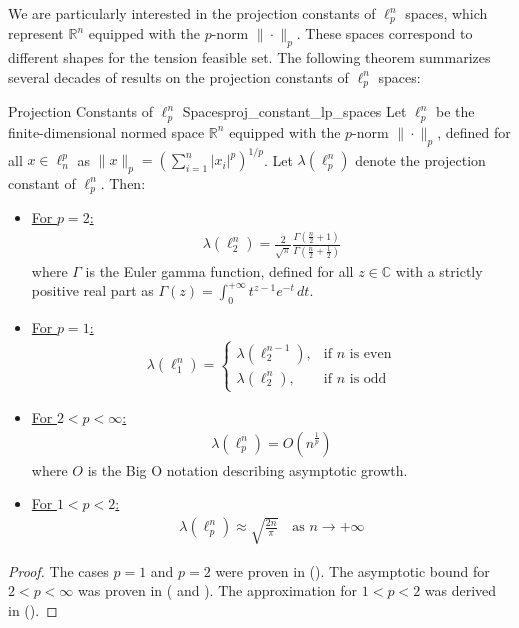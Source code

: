We are particularly interested in the projection constants of $\ell_p^n$ spaces, which represent $\mathbb{R}^n$ equipped with the $p$-norm $\|\cdot\|_p$. These spaces correspond to different shapes for the tension feasible set. The following theorem summarizes several decades of results on the projection constants of $\ell_p^n$ spaces:

\begin{theorembox}{Projection Constants of $\ell_p^n$ Spaces}{proj_constant_lp_spaces}
  Let $\ell_p^n$ be the finite-dimensional normed space $\mathbb{R}^n$ equipped with the $p$-norm $\|\cdot\|_p$, defined for all $x\in \ell_n^p$ as $\|x\|_p=\left(\sum_{i=1}^n \vert x_i \vert^p\right)^{1/p}$. Let $\lambda(\ell_p^n)$ denote the projection constant of $\ell_p^n$. Then:

  \vspace{5mm}

  \begin{itemize}
    \item \underline{For $p=2$:}
    \begin{align*}
            \lambda(\ell_2^n) = \frac{2}{\sqrt{\pi}}\frac{\Gamma(\frac{n}{2} + 1)}{\Gamma(\frac{n}{2} + \frac{1}{2})}
            \end{align*}
    where $\Gamma$ is the Euler gamma function, defined for all $z \in \mathbb{C}$ with a strictly positive real part as $\Gamma(z)=\int_0^{+\infty}t^{z-1}e^{-t}\,dt$.
    \item \vspace{5mm} \underline{For $p=1$:}
    \begin{align*}
            \lambda(\ell_1^n) = \begin{cases} 
               \lambda(\ell_2^{n-1}), & \text{if $n$ is even} \\
               \lambda(\ell_2^n), & \text{if $n$ is odd}
             \end{cases}
            \end{align*}
    \item \vspace{5mm} \underline{For $2<p<\infty$:}
    \begin{align*}
            \lambda(\ell_p^n) = O(n^{\frac{1}{p}})
            \end{align*}
      where $O$ is the Big O notation describing asymptotic growth.
    \item \vspace{5mm} \underline{For $1<p<2$:}
    \begin{align*}
            \lambda(\ell_p^n) \approx \sqrt{\frac{2n}{\pi}}\quad \text{as $n\rightarrow +\infty$}
            \end{align*}
  \end{itemize}
\end{theorembox}
\begin{proof}
  The cases $p=1$ and $p=2$ were proven in (\cite{grunbaumProjectionConstants1960}). The asymptotic bound for $2<p<\infty$ was proven in (\cite{gordonProjectionMacphailConstants1968} and \cite{garlingRelationsConstantsAssociated1971}). The approximation for $1<p<2$ was derived in (\cite{konigProjectionConstantsSymmetric1999}).
\end{proof}

